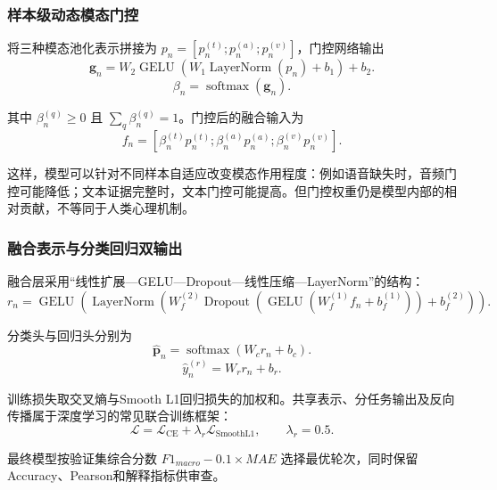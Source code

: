 \documentclass{gmcmthesis}
\newcommand{\vect}[1]{\bm{#1}}
\newcommand{\loss}{\mathcal{L}}
\begin{document}
\subsubsection{样本级动态模态门控}
将三种模态池化表示拼接为 $p_n=[p_n^{(t)};p_n^{(a)};p_n^{(v)}]$，门控网络输出
\begin{equation}
\vect g_n=W_2\operatorname{GELU}(W_1\operatorname{LayerNorm}(p_n)+b_1)+b_2.
\label{eq:gate_logits}
\end{equation}
\begin{equation}
\beta_n=\operatorname{softmax}(\vect g_n).
\label{eq:gate}
\end{equation}
\par\indent 其中 $\beta_n^{(q)}\ge0$ 且 $\sum_q\beta_n^{(q)}=1$。门控后的融合输入为
\begin{equation}
f_n=[\beta_n^{(t)}p_n^{(t)};\beta_n^{(a)}p_n^{(a)};\beta_n^{(v)}p_n^{(v)}].
\end{equation}
\par\indent 这样，模型可以针对不同样本自适应改变模态作用程度：例如语音缺失时，音频门控可能降低；文本证据完整时，文本门控可能提高。但门控权重仍是模型内部的相对贡献，不等同于人类心理机制。
\subsubsection{融合表示与分类回归双输出}
融合层采用“线性扩展—GELU—Dropout—线性压缩—LayerNorm”的结构：
\begin{equation}
r_n=\operatorname{GELU}\left(\operatorname{LayerNorm}\left(W_f^{(2)}\operatorname{Dropout}(\operatorname{GELU}(W_f^{(1)}f_n+b_f^{(1)}))+b_f^{(2)}\right)\right).
\end{equation}
\par\indent 分类头与回归头分别为
\begin{equation}
\hat{\vect p}_n=\operatorname{softmax}(W_c r_n+b_c).
\label{eq:class_head}
\end{equation}
\begin{equation}
\hat y_n^{(r)}=W_r r_n+b_r.
\label{eq:regression_head}
\end{equation}
\par\indent 训练损失取交叉熵与Smooth L1回归损失的加权和。共享表示、分任务输出及反向传播属于深度学习的常见联合训练框架\cite{goodfellow2016deep}：
\begin{equation}
\loss=\loss_{\mathrm{CE}}+\lambda_r\loss_{\mathrm{SmoothL1}},\qquad \lambda_r=0.5.
\label{eq:loss}
\end{equation}
\par\indent 最终模型按验证集综合分数 $F1_{macro}-0.1\times MAE$ 选择最优轮次，同时保留Accuracy、Pearson和解释指标供审查。
\end{document}
